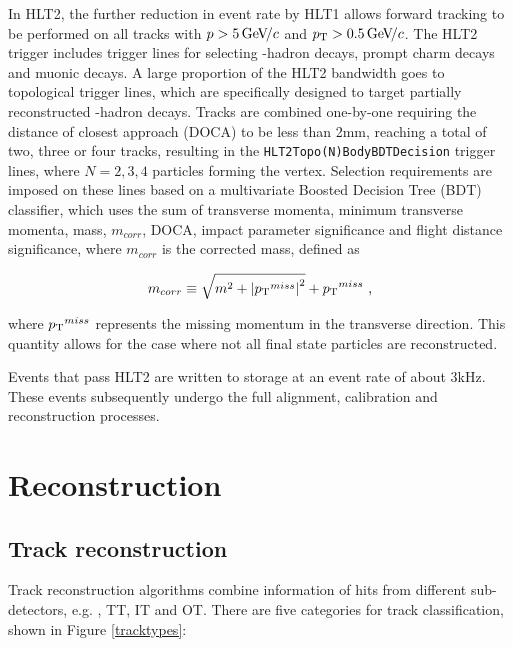 In HLT2, the further reduction in event rate by HLT1 allows forward tracking to be performed on all \velo tracks with $p > 5{\mathrm{\,Ge\kern -0.1em V\!/}c}$ and $\mbox{$p_{\mathrm{ T}}$} > 0.5{\mathrm{\,Ge\kern -0.1em V\!/}c}$. The HLT2 trigger includes trigger lines for selecting \bquark-hadron decays, prompt charm decays and muonic decays. A large proportion of the HLT2 bandwidth goes to topological trigger lines, which are specifically designed to target partially reconstructed \bquark-hadron decays. Tracks are combined one-by-one requiring the distance of closest approach (DOCA) to be less than 2mm, reaching a total of two, three or four tracks, resulting in the {\tt HLT2Topo(N)BodyBDTDecision} trigger lines, where $N = 2,3,4$ particles forming the vertex. Selection requirements are imposed on these lines based on a multivariate Boosted Decision Tree (BDT) classifier, which uses the sum of transverse momenta, minimum transverse momenta, mass, $m_{corr}$, DOCA, impact parameter significance and flight distance significance, where $m_{corr}$ is the corrected mass, defined as

\begin{equation}
m_{corr} \equiv \sqrt{m^2 + {| \mbox{$p_{\mathrm{ T}}$}^{miss} |}^2} + \mbox{$p_{\mathrm{ T}}$}^{miss} \text{ ,}
\end{equation}

where $\mbox{$p_{\mathrm{ T}}$}^{miss}$ represents the missing momentum in the transverse direction. This quantity allows for the case where not all final state particles are reconstructed. 

Events that pass HLT2 are written to storage at an event rate of about 3kHz. These events subsequently undergo the full alignment, calibration and reconstruction processes.

\section{Reconstruction}

\subsection{Track reconstruction}
\label{sec:detector:tracks}

Track reconstruction algorithms combine information of hits from different sub-detectors, e.g. \velo, TT, IT and OT. There are five categories for track classification, shown in Figure \ref{tracktypes}:

